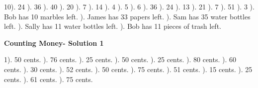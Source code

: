 \documentclass{article}%
\begin{document}
10). 24%
). 36%
). 40%
). 20%
). 7%
). 14%
). 4%
). 5%
). 6%
). 36%
). 24%
). 13%
). 21%
). 7%
). 51%
). 3%
). Bob has 10 marbles left.%
). James has 33 papers left.%
). Sam has 35 water bottles left.%
). Sally has 11 water bottles left.%
). Bob has 11 pieces of trash left.%
\newline%
\newpage%
\large%
\begin{center}%
\textbf{Counting Money- Solution 1}%
\newline%
\end{center} \normalsize%
1). 50 cents.%
). 76 cents.%
). 25 cents.%
). 50 cents.%
). 25 cents.%
). 80 cents.%
). 60 cents.%
). 30 cents.%
). 52 cents.%
). 50 cents.%
). 75 cents.%
). 51 cents.%
). 15 cents.%
). 25 cents.%
). 61 cents.%
). 75 cents.%
\newline%
\end{document}
